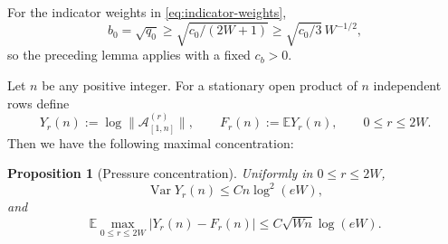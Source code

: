 \documentclass[11pt,reqno]{amsart}
\numberwithin{equation}{section}
\newtheorem{proposition}[theorem]{Proposition}
\theoremstyle{definition}
\theoremstyle{remark}
\newcommand{\E}{\mathbb E}
\newcommand{\1}{\mathbf 1}
\begin{document}
For the indicator weights in \eqref{eq:indicator-weights},
\[
 b_0=\sqrt{q_0}\ge \sqrt{c_0/(2W+1)}
     \ge \sqrt{c_0/3}\,W^{-1/2},
\]
so the preceding lemma applies with a fixed $c_b>0$.

Let $n$ be any positive integer.
For a stationary open product of $n$ independent rows define
\begin{equation}\label{eq:pressure-def}
 Y_r(n):=\log\|\mathcal A_{[1,n]}^{(r)}\|,\qquad
 F_r(n):=\E Y_r(n),\qquad 0\le r\le2W.
\end{equation}
Then we have the following maximal concentration:
\begin{proposition}[Pressure concentration]\label{prop:pressure-concentration}
Uniformly in $0\le r\le2W$,
\begin{equation}\label{eq:pressure-variance}
 \operatorname{Var}Y_r(n)\le Cn\log^2(eW),
\end{equation}
and
\begin{equation}\label{eq:max-pressure-concentration}
 \E\max_{0\le r\le2W}|Y_r(n)-F_r(n)|
 \le C\sqrt{Wn}\log(eW).
\end{equation}
\end{proposition}
\end{document}
